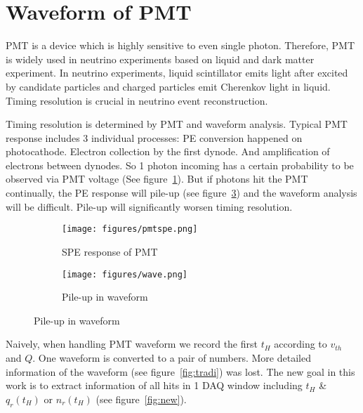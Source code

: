 \section{Waveform of PMT} %
PMT is a device which is highly sensitive to even single photon. Therefore, PMT is widely used in neutrino experiments based on liquid and dark matter experiment. In neutrino experiments, liquid scintillator emits light after excited by candidate particles and charged particles emit Cherenkov light in liquid. Timing resolution is crucial in neutrino event reconstruction. 

Timing resolution is determined by PMT and waveform analysis. Typical PMT response includes 3 individual processes: PE conversion happened on photocathode. Electron collection by the first dynode. And amplification of electrons between dynodes. So 1 photon incoming has a certain probability to be observed via PMT voltage (See figure~\ref{fig:spe}). But if photons hit the PMT continually, the PE response will pile-up (see figure~\ref{fig:pile}) and the waveform analysis will be difficult. Pile-up will significantly worsen timing resolution. 

\begin{figure}[H]
\begin{minipage}{.5\textwidth}
\begin{figure}[H]
    \centering
    \texttt{[image: figures/pmtspe.png]}
    \caption{\label{fig:spe} SPE response of PMT}
\end{figure}
\end{minipage}
\begin{minipage}{.5\textwidth}
\begin{figure}[H]
    \centering
    \texttt{[image: figures/wave.png]}
    \caption{\label{fig:pile} Pile-up in waveform}
\end{figure}
\end{minipage}
\end{figure}

Naively, when handling PMT waveform we record the first $t_{H}$ according to $v_{th}$ and $Q$. One waveform is converted to a pair of numbers. More detailed information of the waveform (see figure~\ref{fig:tradi}) was lost. The new goal in this work is to extract information of all hits in 1 DAQ window including $t_{H}$ \& $q_{r}(t_{H})$ or $n_{r}(t_{H})$ (see figure~\ref{fig:new}). 

